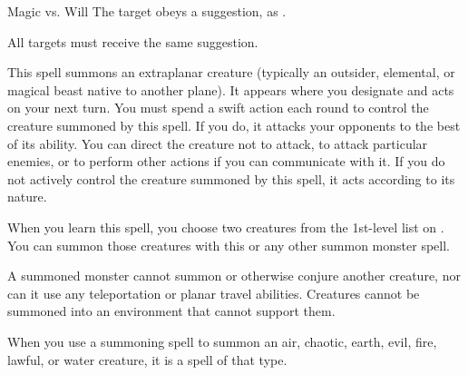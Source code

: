 \begin{spellheader}
    \begin{spelltargetinginfo}
    \end{spelltargetinginfo}
    \begin{spelleffects}
    \end{spelleffects}
\end{spellheader}
\begin{spellcontent}
    \begin{spellattack}{Magic vs. Will}
        \spelleffect The target obeys a suggestion, as .
    \end{spellattack}
    \spelldur{\durmed}
\end{spellcontent}
\begin{spellfooter}
    \spellnotes All targets must receive the same suggestion.
\end{spellfooter}

\hypertarget{spell:summon monster}{}
\begin{spellheader}
\end{spellheader}
\begin{spellcontent}
    \spelleffect This spell summons an extraplanar creature (typically an outsider, elemental, or magical beast native to another plane). It appears where you designate and acts on your next turn. You must spend a swift action each round to control the creature summoned by this spell. If you do, it attacks your opponents to the best of its ability. You can direct the creature not to attack, to attack particular enemies, or to perform other actions if you can communicate with it. If you do not actively control the creature summoned by this spell, it acts according to its nature.
    \par When you learn this spell, you choose two creatures from the 1st-level list on . You can summon those creatures with this or any other summon monster spell.
    \par A summoned monster cannot summon or otherwise conjure another creature, nor can it use any teleportation or planar travel abilities. Creatures cannot be summoned into an environment that cannot support them.
    \par When you use a summoning spell to summon an air, chaotic, earth, evil, fire, lawful, or water creature, it is a spell of that type.
    \spelldur{\durshort \dismissable}
\end{spellcontent}
\begin{spellfooter}

\end{spellfooter}

